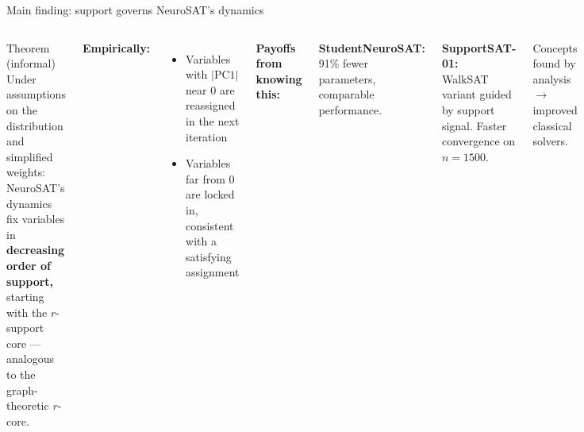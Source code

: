 \documentclass[aspectratio=169,10pt,dvipsnames]{beamer}
\begin{document}
\begin{frame}{Main finding: support governs NeuroSAT's dynamics}

\begin{columns}[T]
\begin{block}{Theorem (informal)}
\small
Under assumptions on the distribution and simplified weights:\\
NeuroSAT's dynamics fix variables in \textbf{decreasing order of support,} starting with the $r$-support core — analogous to the graph-theoretic $r$-core.
\end{block}

\medskip\small
\textbf{Empirically:}
\begin{itemize}
  \item Variables with $|\mathrm{PC1}|$ near 0 are reassigned in the next iteration
  \item Variables far from 0 are locked in, consistent with a satisfying assignment
\end{itemize}

\textbf{Payoffs from knowing this:}

\medskip
\textbf{StudentNeuroSAT:}\\
\small 91\% fewer parameters, comparable performance.

\medskip
\textbf{SupportSAT-01:}\\
\small WalkSAT variant guided by support signal. Faster convergence on $n = 1500$.

\medskip
\begin{alertblock}{}
\small
Concepts found by analysis\\$\to$ improved classical solvers.
\end{alertblock}
\end{columns}

\end{frame}
\end{document}
